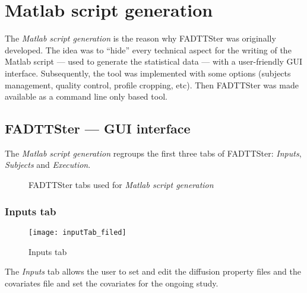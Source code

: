 \documentclass[fadttsterUserGuide_use]{subfiles}
\begin{document}
	\section{Matlab script generation}
	The \textit{Matlab script generation} is the reason why FADTTSter was originally developed. The idea was to ``hide'' every technical aspect for the writing of the Matlab script --- used to generate the statistical data --- with a user-friendly GUI interface. Subsequently, the tool was implemented with some options (subjects management, quality control, profile cropping, etc). Then FADTTSter was made available as a command line only based tool.
	
	\subsection{FADTTSter --- GUI interface}
	The \textit{Matlab script generation} regroups the first three tabs of FADTTSter: \textit{Inputs}, \textit{Subjects} and \textit{Execution}.
	\vfill
	\begin{figure}[H]
    	\caption{FADTTSter tabs used for \textit{Matlab script generation}}
    	\label{fig:matlabScriptGeneration_Tabs}
	\end{figure}
	\vfill
	\vfill
	\newpage
	
	\subsubsection{Inputs tab}
	\begin{figure}[H]
  		\texttt{[image: inputTab\_filed]}
  		\caption{Inputs tab}
    	\label{fig:inputsTab_filed}
	\end{figure}
	The \textit{Inputs} tab allows the user to set and edit the diffusion property files and the covariates file and set the covariates for the ongoing study.
	\vfill
	\newpage
	
\end{document}
